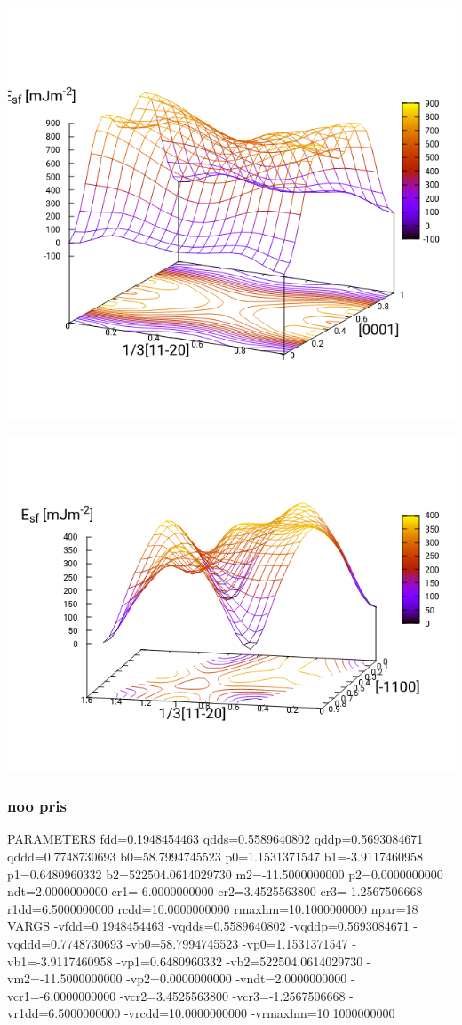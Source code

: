 \documentclass[11pt]{article}
\begin{document}
\begin{center}
\includegraphics[width=.9\linewidth]{Images/prismatic_gs_oo_2019-10-29.png}
\end{center}

\begin{center}
\includegraphics[width=.9\linewidth]{Images/basal_gs_oo_2019-10-29.png}
\end{center}

\subsubsection{noo pris}
\label{sec:org74ad225}
PARAMETERS
  fdd=0.1948454463 qdds=0.5589640802 qddp=0.5693084671 qddd=0.7748730693 b0=58.7994745523 p0=1.1531371547 b1=-3.9117460958 p1=0.6480960332 b2=522504.0614029730 m2=-11.5000000000 p2=0.0000000000 ndt=2.0000000000 cr1=-6.0000000000 cr2=3.4525563800 cr3=-1.2567506668 r1dd=6.5000000000 rcdd=10.0000000000 rmaxhm=10.1000000000 npar=18 
VARGS
    -vfdd=0.1948454463 -vqdds=0.5589640802 -vqddp=0.5693084671 -vqddd=0.7748730693 -vb0=58.7994745523 -vp0=1.1531371547 -vb1=-3.9117460958 -vp1=0.6480960332 -vb2=522504.0614029730 -vm2=-11.5000000000 -vp2=0.0000000000 -vndt=2.0000000000 -vcr1=-6.0000000000 -vcr2=3.4525563800 -vcr3=-1.2567506668 -vr1dd=6.5000000000 -vrcdd=10.0000000000 -vrmaxhm=10.1000000000 
\end{document}
